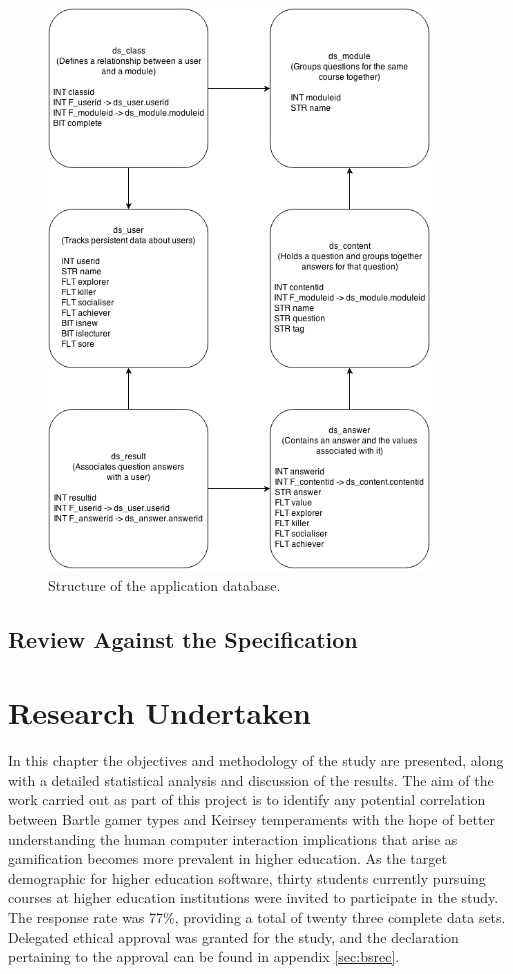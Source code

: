 \documentclass[12pt,a4paper,twoside]{report}
\begin{document}
\begin{figure}
	\begin{center}
		\includegraphics[width=0.9\textwidth]{../img/database.png}
		\caption{Structure of the application database.}
		\label{database}
	\end{center}
\end{figure}

\section{Review Against the Specification}

\chapter{Research Undertaken}
In this chapter the objectives and methodology of the study are presented, along with a detailed statistical analysis and discussion of the results. The aim of the work carried out as part of this project is to identify any potential correlation between Bartle gamer types and Keirsey temperaments with the hope of better understanding the human computer interaction implications that arise as gamification becomes more prevalent in higher education. As the target demographic for higher education software, thirty students currently pursuing courses at higher education institutions were invited to participate in the study. The response rate was 77\%, providing a total of twenty three complete data sets. Delegated ethical approval was granted for the study, and the declaration pertaining to the approval can be found in appendix \ref{sec:bsrec}.
\end{document}
